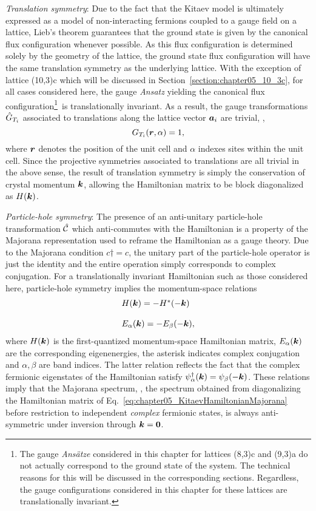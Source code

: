\textit{Translation symmetry}:
Due to the fact that the Kitaev model is ultimately expressed as a model of non-interacting fermions coupled to a gauge field on a lattice, Lieb's theorem guarantees that the ground state is given by the canonical flux configuration whenever possible.
As this flux configuration is determined solely by the geometry of the lattice, the ground state flux configuration will have the same translation symmetry as the underlying lattice.
With the exception of lattice (10,3)c which will be discussed in Section~\ref{section:chapter05_10_3c}, for all cases considered here, the gauge \textit{Ansatz} yielding the canonical flux configuration\footnote{The gauge \textit{Ans\"atze} considered in this chapter for lattices (8,3)c and (9,3)a do not actually correspond to the ground state of the system. The technical reasons for this will be discussed in the corresponding sections. Regardless, the gauge configurations considered in this chapter for these lattices are translationally invariant.}~is translationally invariant.
As a result, the gauge transformations $\hat{G}_{T_i}$ associated to translations along the lattice vector $\bm{a}_i$ are trivial, \ie,
%
\begin{equation}
	G_{T_i}(\bm{r}, \alpha) = 1,
\end{equation}
%
where $\bm{r}$ denotes the position of the unit cell and $\alpha$ indexes sites within the unit cell.
Since the projective symmetries associated to translations are all trivial in the above sense, the result of translation symmetry is simply the conservation of crystal momentum $\bm{k}$, allowing the Hamiltonian matrix to be block diagonalized as $H(\bm{k})$.


\textit{Particle-hole symmetry}:
The presence of an anti-unitary particle-hole transformation $\hat{\mathcal{C}}$ which anti-commutes with the Hamiltonian is a property of the Majorana representation used to reframe the Hamiltonian as a gauge theory.
Due to the Majorana condition $c\dag = c$, the unitary part of the particle-hole operator is just the identity and the entire operation simply corresponds to complex conjugation.
For a translationally invariant Hamiltonian such as those considered here, particle-hole symmetry implies the momentum-space relations
%
\begin{equation}
	\begin{matrix*}[l]
		H(\bk) = -H^*(-\bk) \\
		\\
		E_{\alpha}(\bk) = -E_{\beta}(-\bk),
	\end{matrix*}
\end{equation}
%
where $H(\bm{k})$ is the first-quantized momentum-space Hamiltonian matrix, $E_{\alpha}(\bm{k})$ are the corresponding eigenenergies, the asterisk indicates complex conjugation and $\alpha, \beta$ are band indices.
The latter relation reflects the fact that the complex fermionic eigenstates of the Hamiltonian satisfy $\psi^{\dagger}_{\alpha}(\bm{k}) = \psi_{\beta}(-\bm{k})$.
These relations imply that the Majorana spectrum, \ie, the spectrum obtained from diagonalizing the Hamiltonian matrix of Eq.~\eqref{eq:chapter05_KitaevHamiltonianMajorana} before restriction to independent \textit{complex} fermionic states, is always anti-symmetric under inversion through $\bm{k} = \bm{0}$.


